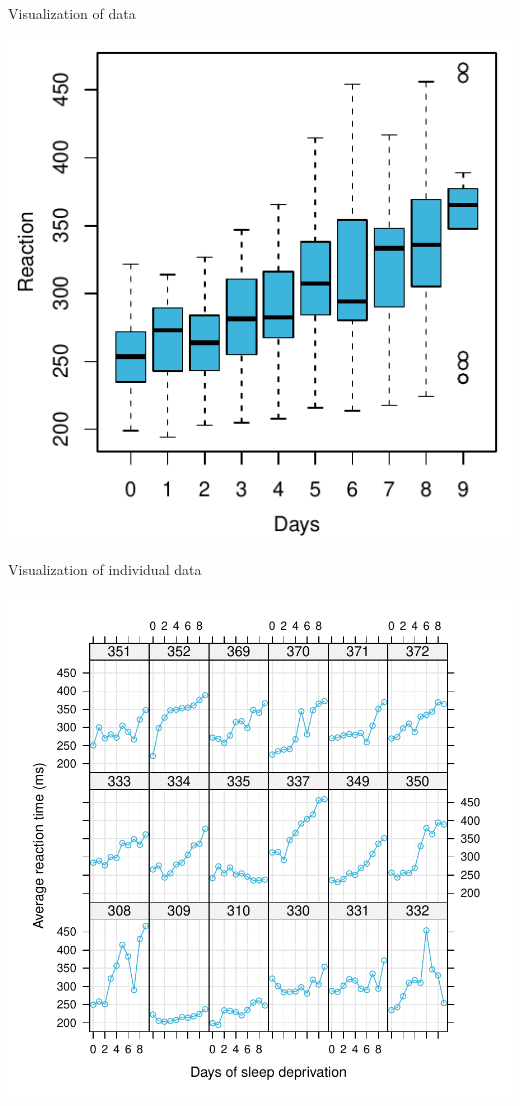 \documentclass[aspectratio=169]{beamer}
\begin{document}
\begin{frame}{Visualization of data}
  \begin{center}
      \includegraphics[scale=.8]{../figures/sleep_box}
  \end{center}
\end{frame}

\begin{frame}{Visualization of individual data}
  \begin{center}
      \includegraphics[scale=.37]{../figures/sleep_subjects}
  \end{center}
\end{frame}
\end{document}
